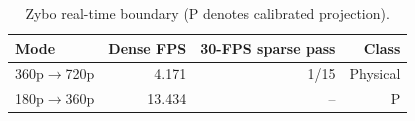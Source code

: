 \begin{table}[t]
\centering
\caption{Zybo real-time boundary (P denotes calibrated projection).}
\label{tab:realtime-envelope}
\begin{tabular}{lrrr}
\toprule
Mode & Dense FPS & 30-FPS sparse pass & Class \\ \midrule
360p$\rightarrow$720p & 4.171 & 1/15 & Physical \\
180p$\rightarrow$360p & 13.434 & -- & P \\
\bottomrule
\end{tabular}
\end{table}
